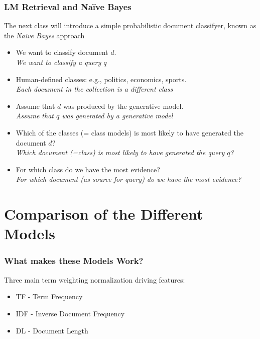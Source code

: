 \documentclass[svgnames]{beamer}
\begin{document}
\begin{frame} \frametitle{LM Retrieval and Na{\"i}ve Bayes}
    
    \begin{block}{}
    The next class will introduce a simple probabilistic document classifyer, known as the \emph{Na{\"i}ve Bayes} approach
    \end{block}
  
    \scriptsize
    \begin{itemize}
    \item We want to classify document $d$. \\ \emph{We want to classify a query $q$}
	\item Human-defined classes: e.g., politics, economics, sports. \\ \emph{Each document in the collection is a different class}
	\item Assume that $d$ was produced by the generative model. \\ \emph{Assume that $q$ was generated by a generative model}
    \item Which of the classes (= class models) is most likely to have generated the document $d$? \\ \emph{Which document (=class) is most likely to have generated the query $q$?}
    \item For which class do we have the most evidence? \\ \emph{For which document (as source for query) do we have the most evidence?}
	\end{itemize}

\end{frame}



\section{Comparison of the Different Models}
\label{sec:comparison}

\begin{frame}  \frametitle{What makes these Models Work?}

\begin{block}{Three main term weighting normalization driving features:}
\begin{itemize}
\item TF - Term Frequency
\item IDF - Inverse Document Frequency
\item DL - Document Length
\end{itemize}
\end{block}
\end{frame}
\end{document}
